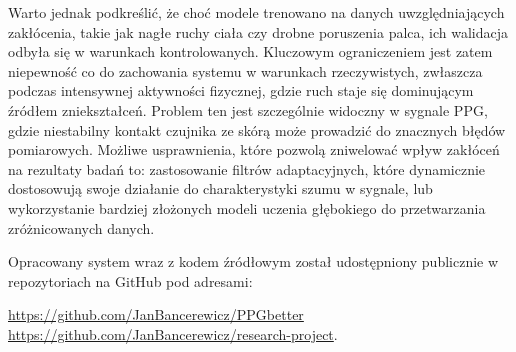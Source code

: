 \documentclass[journal]{IEEEtran}
\begin{document}
{Warto jednak podkreślić, że choć modele trenowano na danych uwzględniających zakłócenia, takie jak nagłe ruchy ciała czy drobne poruszenia palca, ich walidacja odbyła się w warunkach kontrolowanych. Kluczowym ograniczeniem jest zatem niepewność co do zachowania systemu w warunkach rzeczywistych, zwłaszcza podczas intensywnej aktywności fizycznej, gdzie ruch staje się dominującym źródłem zniekształceń. Problem ten jest szczególnie widoczny w sygnale PPG, gdzie niestabilny kontakt czujnika ze skórą może prowadzić do znacznych błędów pomiarowych. Możliwe usprawnienia, które pozwolą zniwelować wpływ zakłóceń na rezultaty badań to: zastosowanie filtrów adaptacyjnych, które dynamicznie dostosowują swoje działanie do charakterystyki szumu w sygnale, lub wykorzystanie bardziej złożonych modeli uczenia głębokiego do przetwarzania zróżnicowanych danych.

\newpage

Opracowany system wraz z kodem źródłowym został udostępniony publicznie w repozytoriach na GitHub pod adresami:

\noindent
\href{https://github.com/JanBancerewicz/PPGbetter}{https://github.com/JanBancerewicz/PPGbetter}
\href{https://github.com/JanBancerewicz/research-project}{https://github.com/JanBancerewicz/research-project}.

 

}
\end{document}
